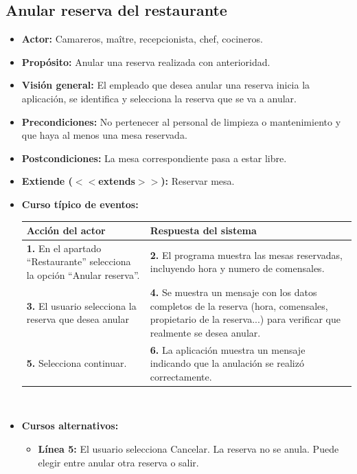 \documentclass[spanish,a4paper,11pt, twoside]{report}	%
\begin{document}

		\subsection{Anular reserva del restaurante}
			\begin{itemize}
			\item \textbf{Actor:} Camareros, maître, recepcionista, chef, cocineros.
			\item \textbf{Propósito:} Anular una reserva realizada con anterioridad.
			\item \textbf{Visión general:} El empleado que desea anular una reserva inicia
							la aplicación, se identifica y selecciona la reserva que se va a anular.
			\item \textbf{Precondiciones:} No pertenecer al personal de limpieza o
							mantenimiento y que haya al menos una mesa reservada.
			\item \textbf{Postcondiciones:} La mesa correspondiente pasa a estar libre.
			\item \textbf{Extiende ($<<$extends$>>$):} Reservar mesa.
			\item \textbf{Curso típico de eventos:} 	\\
				\begin{tabular}{|p{6cm}||p{6cm}|}
				\hline
				\textbf{Acción del actor} & \textbf{Respuesta del sistema} \\ \hline \hline
				\textbf{1.} En el apartado ``Restaurante'' selecciona la opción ``Anular reserva''. & 
				\textbf{2.} El programa muestra las mesas reservadas, incluyendo hora y numero de comensales. \\ \hline
				\textbf{3.} El usuario selecciona la reserva que desea anular	& 
				\textbf{4.} Se muestra un mensaje con los datos completos de la reserva (hora,
					comensales, propietario de la reserva...) para verificar que realmente se desea
					anular. \\ \hline
				\textbf{5.} Selecciona continuar.	& 
				\textbf{6.} La aplicación muestra un mensaje indicando que la anulación se realizó correctamente. \\ \hline
			\end{tabular}
			\\
			\item \textbf{Cursos alternativos:} 
			\begin{itemize}
				\item  \textbf{Línea 5:} El usuario selecciona Cancelar. La reserva no se anula.
										Puede elegir entre anular otra reserva o salir.
			\end {itemize}
		\end {itemize}
	
\end{document}
